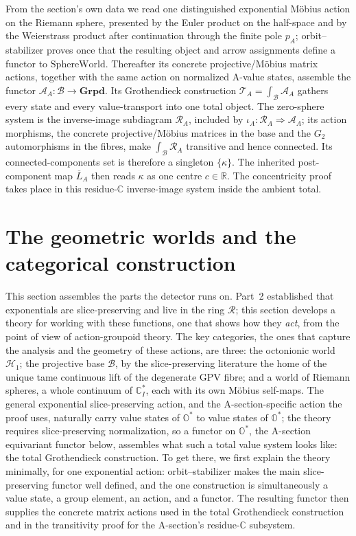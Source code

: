 \documentclass[11pt]{article}
\newcommand{\OO}{\mathbb{O}}
\newcommand{\CC}{\mathbb{C}}
\newcommand{\RR}{\mathbb{R}}
\providecommand{\SphereWorld}{\mathrm{SphereWorld}}
\theoremstyle{plain}
\theoremstyle{definition}
\theoremstyle{remark}
\begin{document}
From the section's own data we read one distinguished exponential M\"obius action on the
Riemann sphere, presented by the Euler product on the half-space and by the Weierstrass product
after continuation through the finite pole $p_A$;
orbit--stabilizer proves once that the resulting object and arrow assignments define a functor
to $\SphereWorld$. Thereafter its concrete projective/M\"obius matrix actions, together with the
same action on normalized A-value states, assemble the functor
$\mathcal A_A:\mathcal B\to\mathbf{Grpd}$. Its Grothendieck
construction $\mathcal T_A=\int_{\mathcal B}\mathcal A_A$ gathers every state and every
value-transport into one total object. The zero-sphere system is the inverse-image subdiagram
$\mathcal R_A$, included by $\iota_A:\mathcal R_A\Rightarrow\mathcal A_A$; its action morphisms,
the concrete projective/M\"obius matrices in the base and the $G_2$ automorphisms in the fibres, make
$\int_{\mathcal B}\mathcal R_A$ transitive and hence connected.
Its connected-components set is therefore a singleton $\{\kappa\}$. The
inherited post-component map $\overline L_A$ then reads $\kappa$ as one centre
$c\in\RR$. The concentricity proof takes place in this residue-$\CC$ inverse-image
system inside the ambient total.

\section{The geometric worlds and the categorical construction}\label{sec:tower-stack}

This section assembles the parts the detector runs on. Part~2 established
that exponentials are slice-preserving and live in the ring $\mathcal R$;
this section develops a theory for working with these functions, one that
shows how they \emph{act}, from the point of view of action-groupoid theory.
The key categories, the ones that capture the analysis and the geometry of
these actions, are three: the octonionic world $\mathcal H_1$; the
projective base $\mathcal B$, by the slice-preserving literature the home of
the unique tame continuous lift of the degenerate GPV fibre; and a world of
Riemann spheres, a whole continuum of $\CC_I^{*}$, each with its own
M\"obius self-maps. The general exponential slice-preserving action, and the
A-section-specific action the proof uses, naturally carry value states of
$\OO^{*}$ to value states of $\OO^{*}$; the theory requires slice-preserving
normalization, so a functor on $\OO^{*}$, the A-section equivariant functor
below, assembles what such a total value system looks like: the total
Grothendieck construction. To get there, we first explain the theory
minimally, for one exponential action: orbit--stabilizer makes the main
slice-preserving functor well defined, and the one construction is
simultaneously a value state, a group element, an action, and a functor. The
resulting functor then supplies the concrete matrix actions used in the total
Grothendieck construction and in the transitivity proof for the A-section's
residue-$\CC$ subsystem.
\end{document}
